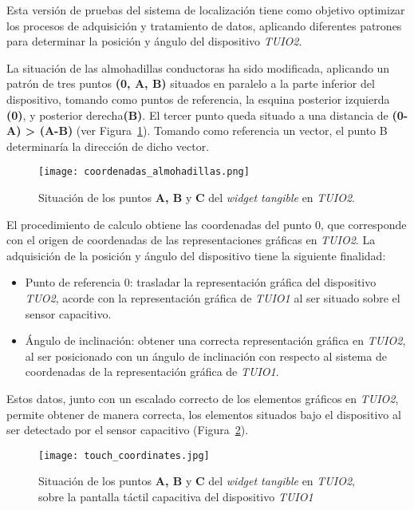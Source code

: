 Esta versión de pruebas del sistema de localización tiene como objetivo optimizar los procesos de adquisición y tratamiento de datos, aplicando diferentes patrones para determinar la posición y ángulo del dispositivo \emph{TUIO2}.

La situación de las almohadillas conductoras ha sido modificada, aplicando un patrón de tres puntos \textbf{(0, A, B)} situados en paralelo a la parte inferior del dispositivo, tomando como puntos de referencia, la esquina posterior izquierda \textbf{(0)}, y posterior derecha\textbf{(B)}. El tercer punto queda situado a una distancia de \textbf{(0-A) > (A-B)} (ver Figura~\ref{fig:coorlineal}). Tomando como referencia un vector, el punto B determinaría la dirección de dicho vector.

\begin{figure}[!h]
\begin{center}
\texttt{[image: coordenadas\_almohadillas.png]}
\caption{Situación de los puntos \textbf{A, B} y \textbf{C} del \emph{widget tangible} en \emph{TUIO2}. }
\label{fig:coorlineal}
\end{center}
\end{figure}

El procedimiento de calculo obtiene las coordenadas del punto 0, que corresponde con el origen de coordenadas de las representaciones gráficas en \emph{TUIO2}.
La adquisición de la posición y ángulo del dispositivo tiene la siguiente finalidad:
\begin{itemize}
\item Punto de referencia 0: trasladar la representación gráfica del dispositivo \emph{TUO2}, acorde con la representación gráfica de \emph{TUIO1} al ser situado sobre el sensor capacitivo.
\item Ángulo de inclinación: obtener una correcta representación gráfica en \emph{TUIO2}, al ser posicionado con un ángulo de inclinación con respecto al sistema de coordenadas de la representación gráfica de \emph{TUIO1}.
\end{itemize}
Estos datos, junto con un escalado correcto de los elementos gráficos en \emph{TUIO2}, permite obtener de manera correcta, los elementos situados bajo el dispositivo al ser detectado por el sensor capacitivo (Figura~\ref{fig:touchcoord}).

\begin{figure}[!h]
\begin{center}
\texttt{[image: touch\_coordinates.jpg]}
\caption{Situación de los puntos \textbf{A, B} y \textbf{C} del \emph{widget tangible} en \emph{TUIO2}, sobre la pantalla táctil capacitiva del dispositivo \emph{TUIO1} }
\label{fig:touchcoord}
\end{center}
\end{figure}

